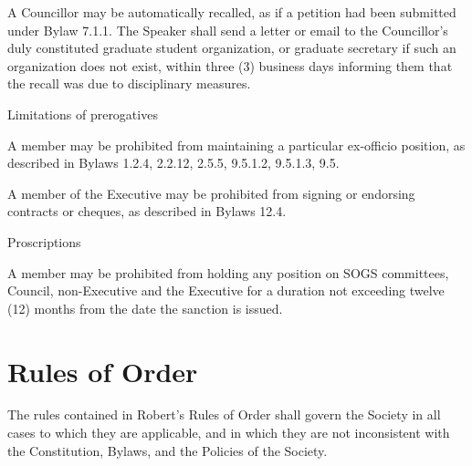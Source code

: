 \begin{longenum}[ label*=\thesubsection.\arabic*., align=left]
\begin{longenum}[ label*=\arabic*., align=left]
        \item A Councillor may be automatically recalled, as if a petition had been submitted under Bylaw 7.1.1. The Speaker shall send a letter or email to the Councillor's duly constituted graduate student organization, or graduate secretary if such an organization does not exist, within three (3) business days informing them that the recall was due to disciplinary measures.
	\end{longenum}
    \item Limitations of prerogatives
    \begin{longenum}[ label*=\arabic*., align=left]
		\item A member may be prohibited from maintaining a particular ex-officio position, as described in Bylaws 1.2.4, 2.2.12, 2.5.5, 9.5.1.2, 9.5.1.3, 9.5.
        \item A member of the Executive may be prohibited from signing or endorsing contracts or cheques, as described in Bylaws 12.4.
	\end{longenum}
    \item Proscriptions
    \begin{longenum}[ label*=\arabic*., align=left]
		\item A member may be prohibited from holding any position on SOGS committees, Council, non-Executive and the Executive for a duration not exceeding twelve (12) months from the date the sanction is issued.
	\end{longenum}
\end{longenum}

\newpage

\section{Rules of Order}
\begin{longenum}[ label*=\thesection.\arabic*., align=left]
	\item The rules contained in Robert's Rules of Order shall govern the Society in all cases to which they are applicable, and in which they are not inconsistent with the Constitution, Bylaws, and the Policies of the Society.
\end{longenum}
\newpage

